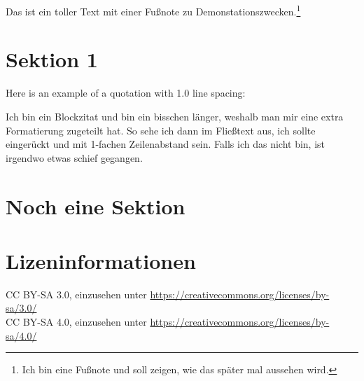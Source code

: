 \documentclass[12pt,a4paper]{article} %
\newenvironment{blockzitat}
{\singlespacing\quote}
{\endquote}
\begin{document}
	Das ist ein toller Text mit einer Fußnote zu Demonstationszwecken.\footnote{Ich bin eine Fußnote und soll zeigen, wie das später mal aussehen wird.}
	
	\section{Sektion 1}
	
	Here is an example of a quotation with 1.0 line spacing:
	
	\begin{blockzitat}
		Ich bin ein Blockzitat und bin ein bisschen länger, weshalb man mir eine extra Formatierung zugeteilt hat. So sehe ich dann im Fließtext aus, ich sollte eingerückt und mit 1-fachen Zeilenabstand sein. Falls ich das nicht bin, ist irgendwo etwas schief gegangen.
	\end{blockzitat}
	
	\section{Noch eine Sektion}
	
	
\newpage
\printbibliography[heading=bibintoc,keyword={source},title={Quellenverzeichnis}] %
\printbibliography[heading=bibintoc,notkeyword={source},title={Literaturverzeichnis}] %
\listoffigures %
	
	
\section*{Lizeninformationen}
CC BY-SA 3.0, einzusehen unter \url{https://creativecommons.org/licenses/by-sa/3.0/} \\
CC BY-SA 4.0, einzusehen unter \url{https://creativecommons.org/licenses/by-sa/4.0/}
	
	
\end{document}
